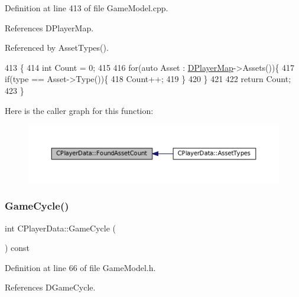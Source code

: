 Definition at line 413 of file Game\+Model.\+cpp.



References D\+Player\+Map.



Referenced by Asset\+Types().


\begin{DoxyCode}
413                                                \{
414     \textcolor{keywordtype}{int} Count = 0;
415     
416     \textcolor{keywordflow}{for}(\textcolor{keyword}{auto} Asset : \hyperlink{classCPlayerData_a452163191cd4603e1e38dd8d4bb9691c}{DPlayerMap}->Assets())\{
417         \textcolor{keywordflow}{if}(type == Asset->Type())\{
418             Count++;
419         \}
420     \}
421     
422     \textcolor{keywordflow}{return} Count;
423 \}
\end{DoxyCode}
Here is the caller graph for this function\+:\nopagebreak
\begin{figure}[H]
\begin{center}
\leavevmode
\includegraphics[width=350pt]{classCPlayerData_ac81c0899651bf3f9962b03ef0d7a2415_icgraph}
\end{center}
\end{figure}
\hypertarget{classCPlayerData_a91ef320747b0c6281c05a9284279e16a}{}\label{classCPlayerData_a91ef320747b0c6281c05a9284279e16a} 
\subsubsection{\texorpdfstring{Game\+Cycle()}{GameCycle()}}
{\footnotesize\ttfamily int C\+Player\+Data\+::\+Game\+Cycle (\begin{DoxyParamCaption}{ }\end{DoxyParamCaption}) const\hspace{0.3cm}{\ttfamily [inline]}}



Definition at line 66 of file Game\+Model.\+h.



References D\+Game\+Cycle.


